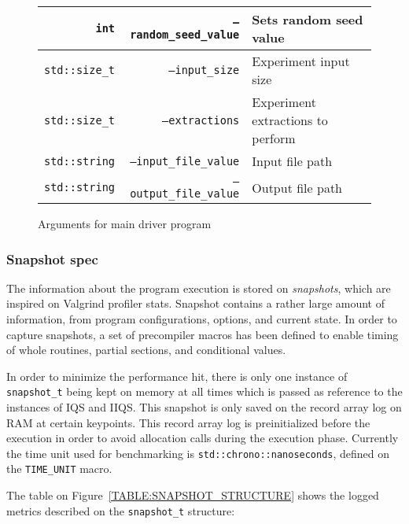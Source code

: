 \begin{figure}[!ht]
\begin{tabularx}{\linewidth}{|r|r|X|}
        \hline
        \texttt{int} & \texttt{--random\_seed\_value} & Sets random seed value \\
        \hline
        \texttt{std::size\_t} & \texttt{--input\_size} & Experiment input size \\
        \hline
        \texttt{std::size\_t} & \texttt{--extractions} & Experiment extractions to perform \\
        \hline
        \texttt{std::string} & \texttt{--input\_file\_value} & Input file path \\
        \hline
        \texttt{std::string} & \texttt{--output\_file\_value} & Output file path \\
        \hline    
    \end{tabularx}
    \caption{Arguments for main driver program}
    \label{TABLE:ARGUMENTS}
\end{figure}



\subsubsection{Snapshot spec}
The information about the program execution is stored on \textit{snapshots}, which are inspired on Valgrind profiler stats. Snapshot contains a rather large amount of information, from program configurations, options, and current state. In order to capture snapshots, a set of precompiler macros has been defined to enable timing of whole routines, partial sections, and conditional values. 

In order to minimize the performance hit, there is only one instance of \texttt{snapshot\_t} being kept on memory at all times which is passed as reference to the instances of IQS and IIQS. This snapshot is only saved on the record array log on RAM at certain keypoints. This record array log is preinitialized before the execution in order to avoid allocation calls during the execution phase. Currently the time unit used for benchmarking is \texttt{std::chrono::nanoseconds}, defined on the \texttt{TIME\_UNIT} macro.

The table on Figure~\ref{TABLE:SNAPSHOT_STRUCTURE} shows the logged metrics described on the \texttt{snapshot\_t} structure:



